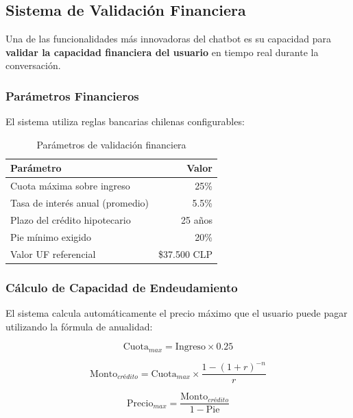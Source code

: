 \documentclass[11pt,letterpaper]{article}
\begin{document}
\subsection{Sistema de Validación Financiera}

Una de las funcionalidades más innovadoras del chatbot es su capacidad para \textbf{validar la capacidad financiera del usuario} en tiempo real durante la conversación.

\subsubsection{Parámetros Financieros}

El sistema utiliza reglas bancarias chilenas configurables:

\begin{table}[H]
\centering
\caption{Parámetros de validación financiera}
\label{tab:financiero}
\begin{tabular}{@{}lr@{}}
\toprule
\textbf{Parámetro} & \textbf{Valor} \\
\midrule
Cuota máxima sobre ingreso & 25\% \\
Tasa de interés anual (promedio) & 5.5\% \\
Plazo del crédito hipotecario & 25 años \\
Pie mínimo exigido & 20\% \\
Valor UF referencial & \$37.500 CLP \\
\bottomrule
\end{tabular}
\end{table}

\subsubsection{Cálculo de Capacidad de Endeudamiento}

El sistema calcula automáticamente el precio máximo que el usuario puede pagar utilizando la fórmula de anualidad:

\begin{equation}
\text{Cuota}_{max} = \text{Ingreso} \times 0.25
\end{equation}

\begin{equation}
\text{Monto}_{crédito} = \text{Cuota}_{max} \times \frac{1 - (1 + r)^{-n}}{r}
\end{equation}

\begin{equation}
\text{Precio}_{max} = \frac{\text{Monto}_{crédito}}{1 - \text{Pie}}
\end{equation}
\end{document}
